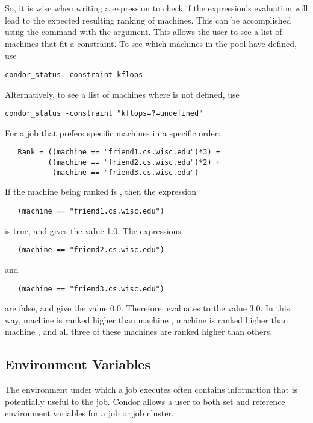 So, it is wise when writing a  expression to check
if the expression's evaluation will lead to the expected
resulting ranking of machines.
This can be accomplished using the  command with the
 argument.  This allows the user to see a list of
machines that fit a constraint.
To see which machines in the pool have  defined,
use
\begin{verbatim}
condor_status -constraint kflops
\end{verbatim}
Alternatively, to see a list of machines where 
 is not defined, use
\begin{verbatim}
condor_status -constraint "kflops=?=undefined"
\end{verbatim}

For a job that prefers specific machines in a specific order:
\begin{verbatim}
   Rank = ((machine == "friend1.cs.wisc.edu")*3) +
          ((machine == "friend2.cs.wisc.edu")*2) +
           (machine == "friend3.cs.wisc.edu")
\end{verbatim}
If the machine being ranked is , then the
expression
\begin{verbatim}
   (machine == "friend1.cs.wisc.edu")
\end{verbatim}
is true, and gives the value 1.0.
The expressions
\begin{verbatim}
   (machine == "friend2.cs.wisc.edu")
\end{verbatim}
and
\begin{verbatim}
   (machine == "friend3.cs.wisc.edu")
\end{verbatim}
are false, and give the value 0.0.
Therefore,  evaluates to the value 3.0.
In this way, machine  is ranked higher than
machine ,
machine 
is ranked higher than 
machine ,
and all three of these machines are ranked higher than others.



\subsection{Environment Variables}

The environment under which a job executes often contains
information that is potentially useful to the job.
Condor allows a user to both set and reference environment
variables for a job or job cluster.

